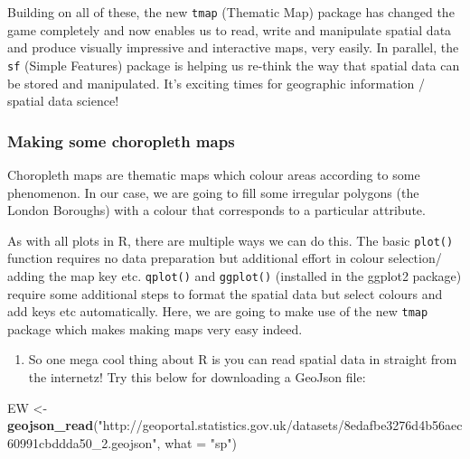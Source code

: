 \documentclass[]{book}
\newenvironment{Shaded}{\begin{snugshade}}{\end{snugshade}}
\newcommand{\CommentTok}[1]{\textcolor[rgb]{0.56,0.35,0.01}{\textit{#1}}}
\newcommand{\DataTypeTok}[1]{\textcolor[rgb]{0.13,0.29,0.53}{#1}}
\newcommand{\KeywordTok}[1]{\textcolor[rgb]{0.13,0.29,0.53}{\textbf{#1}}}
\newcommand{\NormalTok}[1]{#1}
\newcommand{\OperatorTok}[1]{\textcolor[rgb]{0.81,0.36,0.00}{\textbf{#1}}}
\newcommand{\StringTok}[1]{\textcolor[rgb]{0.31,0.60,0.02}{#1}}
\providecommand{\tightlist}{%
  \setlength{\itemsep}{0pt}\setlength{\parskip}{0pt}}
\begin{document}
Building on all of these, the new \texttt{tmap} (Thematic Map) package has changed the game completely and now enables us to read, write and manipulate spatial data and produce visually impressive and interactive maps, very easily. In parallel, the \texttt{sf} (Simple Features) package is helping us re-think the way that spatial data can be stored and manipulated. It's exciting times for geographic information / spatial data science!

\hypertarget{making-some-choropleth-maps}{%
\subsubsection{Making some choropleth maps}\label{making-some-choropleth-maps}}

Choropleth maps are thematic maps which colour areas according to some phenomenon. In our case, we are going to fill some irregular polygons (the London Boroughs) with a colour that corresponds to a particular attribute.

As with all plots in R, there are multiple ways we can do this. The basic \texttt{plot()} function requires no data preparation but additional effort in colour selection/ adding the map key etc. \texttt{qplot()} and \texttt{ggplot()} (installed in the ggplot2 package) require some additional steps to format the spatial data but select colours and add keys etc automatically. Here, we are going to make use of the new \texttt{tmap} package which makes making maps very easy indeed.

\begin{enumerate}
\def\labelenumi{\arabic{enumi}.}
\setcounter{enumi}{5}
\tightlist
\item
  So one mega cool thing about R is you can read spatial data in straight from the internetz! Try this below for downloading a GeoJson file:
\end{enumerate}

\begin{Shaded}
\begin{Highlighting}[]
\NormalTok{EW <-}\StringTok{ }\KeywordTok{geojson_read}\NormalTok{(}\StringTok{"http://geoportal.statistics.gov.uk/datasets/8edafbe3276d4b56aec60991cbddda50_2.geojson"}\NormalTok{, }\DataTypeTok{what =} \StringTok{"sp"}\NormalTok{)}
\end{Highlighting}
\end{Shaded}

\begin{Shaded}
\end{Shaded}
\end{document}
